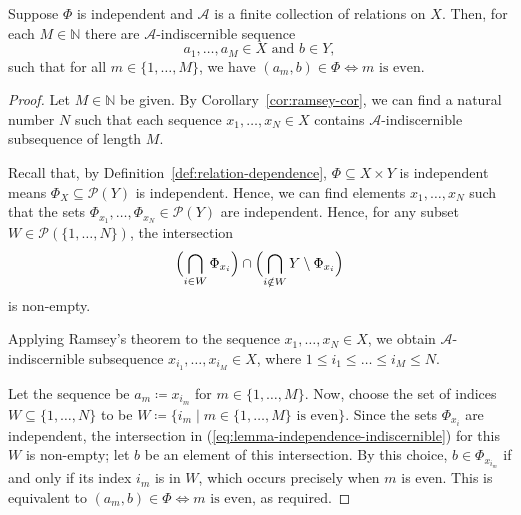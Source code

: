 \begin{lemma}{\label{lem:indiscernible-seq-1}}
    Suppose $\Phi$ is independent and $\mathcal{A}$ is a finite collection of relations on $X$. Then, for each $M \in \mathbb{N}$ there are $\mathcal{A}$-indiscernible sequence
    \[
        a_1, \dots, a_M \in X \text{ and } b \in Y,
    \]
    such that for all $m \in \{1, \dots, M\}$, we have $(a_m, b) \in \Phi \iff m \text{ is even.}$
\end{lemma}

\begin{proof}

    Let $M \in \mathbb{N}$ be given. By Corollary~\ref{cor:ramsey-cor}, we can find a natural number $N$ such that each sequence $x_1, \dots, x_N \in X$ contains $\mathcal{A}$-indiscernible subsequence of length $M$.

    Recall that, by Definition~\ref{def:relation-dependence}, $\Phi \subseteq X \times Y$ is independent means $\Phi_X \subseteq \mathcal{P}(Y)$ is independent. Hence, we can find elements $x_1, \dots, x_N$ such that the sets $\Phi_{x_1}, \dots, \Phi_{x_N} \in \mathcal{P}(Y)$ are independent. Hence, for any subset $W \in \mathcal{P}(\{1, \dots, N\})$, the intersection
    \begin{equation}
        \label{eq:lemma-independence-indiscernible}
        \Bigl(\bigcap_{i \in W} \Phi_{x_i}\Bigr) \cap \Bigl( \bigcap_{i \notin W} Y \setminus \Phi_{x_i} \Bigr)
    \end{equation}
    is non-empty.

    Applying Ramsey's theorem to the sequence $x_1, \dots, x_N \in X$, we obtain $\mathcal{A}$-indiscernible subsequence $x_{i_1}, \dots, x_{i_M} \in X$, where $1 \leq i_1 \leq \dots \leq i_M \leq N$.

    Let the sequence be $a_m \coloneq x_{i_m}$ for $m \in \{1, \dots, M\}$. Now, choose the set of indices $W \subseteq \{1, \dots, N\}$ to be $W \coloneq \{i_m \mid m \in \{1, \dots, M\} \text{ is even}\}$. Since the sets $\Phi_{x_i}$ are independent, the intersection in (\ref{eq:lemma-independence-indiscernible}) for this $W$ is non-empty; let $b$ be an element of this intersection. By this choice, $b \in \Phi_{x_{i_m}}$ if and only if its index $i_m$ is in $W$, which occurs precisely when $m$ is even. This is equivalent to $(a_m, b) \in \Phi \iff m \text{ is even}$, as required.

\end{proof}

